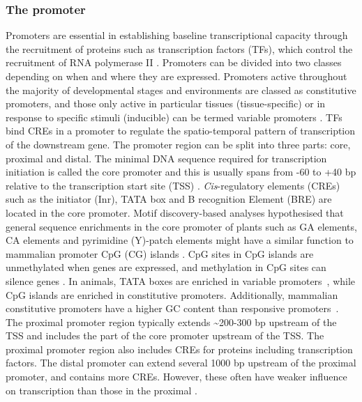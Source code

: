 \documentclass[../main.tex]{subfiles}
\begin{document}
\subsubsection{The promoter}\label{chapter1:the-promoter}
Promoters are essential in establishing baseline transcriptional capacity through the recruitment of proteins such as transcription factors (TFs), which control the recruitment of RNA polymerase II \autocite{portoPlantPromotersApproach2014}.
Promoters can be divided into two classes depending on when and where they are expressed.
Promoters active throughout the majority of developmental stages and environments are classed as constitutive promoters, and those only active in particular tissues (tissue\hyp{}specific) or in response to specific stimuli (inducible) can be termed variable promoters \autocite{bilasCisregulatoryElementsUsed2016}.
TFs bind CREs in a promoter to regulate the spatio\hyp{}temporal pattern of transcription of the downstream gene.
The promoter region can be split into three parts: core, proximal and distal.
The minimal DNA sequence required for transcription initiation is called the core promoter and this is usually spans from -60 to +40 bp relative to the transcription start site (TSS) \autocite{solovyevIdentificationPromoterRegions2010,royCorePromotersTranscription2015}.
\textit{Cis}\hyp{}regulatory elements (CREs) such as the initiator (Inr), TATA box and B recognition Element (BRE) are located in the core promoter.
Motif discovery\hyp{}based analyses hypothesised that general sequence enrichments in the core promoter of plants such as GA elements, CA elements and pyrimidine (Y)\hyp{}patch elements might have a similar function to mammalian promoter CpG (CG) islands \autocite{yamamotoCharacteristicsCorePromoter2011,yamamotoHeterogeneityArabidopsisCore2009}.
CpG sites in CpG islands are unmethylated when genes are expressed, and methylation in CpG sites can silence genes \autocite{birdDNAMethylationPatterns2002}.
In animals, TATA boxes are enriched in variable promoters~\autocite{engstromGenomicRegulatoryBlocks2007,carninciGenomewideAnalysisMammalian2006}, while CpG islands are enriched in constitutive promoters.
Additionally, mammalian constitutive promoters have a higher GC content than responsive promoters~\autocite{vinogradovDNAHelixImportance2017, weiCharacterizationGenePromoters2019}.
The proximal promoter region typically extends \textasciitilde200\hyp{}300 bp upstream of the TSS and includes the part of the core promoter upstream of the TSS.
The proximal promoter region also includes CREs for proteins including transcription factors.
The distal promoter can extend several 1000 bp upstream of the proximal promoter, and contains more CREs.
However, these often have weaker influence on transcription than those in the proximal \autocite{pandiarajanVivoPromoterEngineering2018}.
\end{document}
